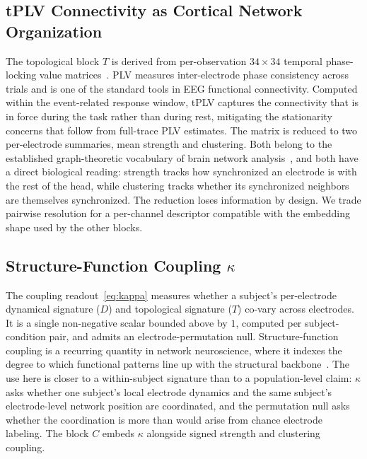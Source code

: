 \documentclass[journal]{IEEEtran}
\begin{document}
\subsection{tPLV Connectivity as Cortical Network Organization}
The topological block $T$ is derived from per-observation $34\times34$ temporal phase-locking value matrices~\cite{lachaux1999plv}. PLV measures inter-electrode phase consistency across trials and is one of the standard tools in EEG functional connectivity. Computed within the event-related response window, tPLV captures the connectivity that is in force during the task rather than during rest, mitigating the stationarity concerns that follow from full-trace PLV estimates. The matrix is reduced to two per-electrode summaries, mean strength and clustering. Both belong to the established graph-theoretic vocabulary of brain network analysis~\cite{bullmore2009complex}, and both have a direct biological reading: strength tracks how synchronized an electrode is with the rest of the head, while clustering tracks whether its synchronized neighbors are themselves synchronized. The reduction loses information by design. We trade pairwise resolution for a per-channel descriptor compatible with the embedding shape used by the other blocks.

\subsection{Structure-Function Coupling $\kappa$}
The coupling readout~\eqref{eq:kappa} measures whether a subject's per-electrode dynamical signature ($D$) and topological signature ($T$) co-vary across electrodes. It is a single non-negative scalar bounded above by $1$, computed per subject-condition pair, and admits an electrode-permutation null. Structure-function coupling is a recurring quantity in network neuroscience, where it indexes the degree to which functional patterns line up with the structural backbone~\cite{honey2009structural,park2013structural,suarez2020linking}. The use here is closer to a within-subject signature than to a population-level claim: $\kappa$ asks whether one subject's local electrode dynamics and the same subject's electrode-level network position are coordinated, and the permutation null asks whether the coordination is more than would arise from chance electrode labeling. The block $C$ embeds $\kappa$ alongside signed strength and clustering coupling.
\end{document}
